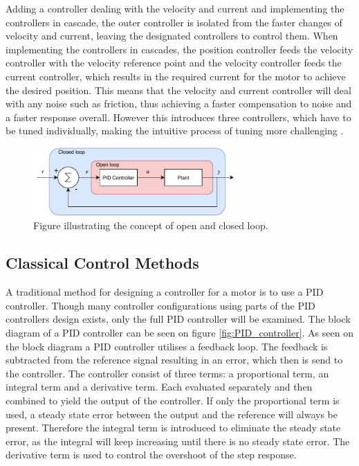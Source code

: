 \documentclass[../../main.tex]{subfiles}
\begin{document}
Adding a controller dealing with the velocity and current and implementing the controllers in cascade, the outer controller is isolated from the faster changes of velocity and current, leaving the designated controllers to control them. When implementing the controllers in cascades, the position controller feeds the velocity controller with the velocity reference point and the velocity controller feeds the current controller, which results in the required current for the motor to achieve the desired position. This means that the velocity and current controller will deal with any noise such as friction, thus achieving a faster compensation to noise and a faster response overall. However this introduces three controllers, which have to be tuned individually, making the intuitive process of tuning more challenging \cite{CascadeControl}.

\begin{figure}[H]
    \centering
    \includegraphics[width=0.7\textwidth]{Sections/Miscellaneous/Images/Open_closed_Diagram.pdf}
    \caption{Figure illustrating the concept of open and closed loop. }
    \label{fig:Open_Close_loop}
\end{figure}





\subsection*{Classical Control Methods}
A traditional method for designing a controller for a motor is to use a PID controller. Though many controller configurations using parts of the PID controllers design exists, only the full PID controller will be examined. The block diagram of a PID controller can be seen on figure \ref{fig:PID_controller}. As seen on the block diagram
a PID controller utilises a feedback loop. The feedback is subtracted from the reference signal resulting in an error, which then is send to the controller. The controller consist of three terms: a proportional term, an integral term and a derivative term. Each evaluated separately and then combined to yield the output of the controller. If only the proportional term is used, a steady state error between the output and the reference will always be present. Therefore the integral term is introduced to eliminate the steady state error, as the integral will keep increasing until there is no steady state error. The derivative term is used to control the overshoot of the step response.
\end{document}

